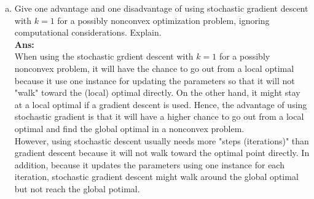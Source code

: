 \documentclass[11pt]{article}
\begin{document}
\begin{enumerate}[(a)]
\item Give one advantage and one disadvantage of using stochastic gradient
descent with $k=1$ for a possibly nonconvex optimization problem, ignoring computational considerations.  Explain.\\
\textbf{Ans:}\\
When using the stochastic grdient descent with $k=1$ for a possibly nonconvex problem, it will have the chance to go out from a local optimal because it use one instance for updating the parameters so that it will not "walk" toward the (local) optimal directly. On the other hand, it might stay at a local optimal if a gradient descent is used. Hence, the advantage of using stochastic gradient is that it will have a higher chance to go out from a local optimal and find the global optimal in a nonconvex problem.\\
However, using stochastic descent usually needs more "steps (iterations)" than gradient descent because it will not walk toward the optimal point directly. In addition, because it updates the parameters using one instance for each iteration, stochastic gradient descent might walk around the global optimal but not reach the global potimal.\\
\end{enumerate}
\end{document}
